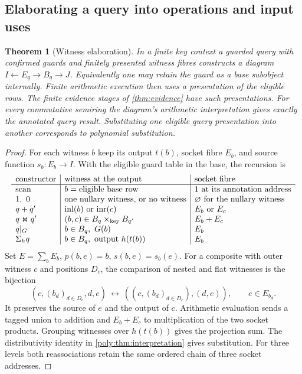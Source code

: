\documentclass[11pt,a4paper]{article}
\newtheorem{theorem}{Theorem}[section]
\theoremstyle{definition}
\theoremstyle{remark}\newaliascnt{remark}{theorem}
\numberwithin{equation}{section}
\begin{document}
\subsection{Elaborating a query into operations and input uses}
\begin{theorem}[Witness elaboration]\label{thm:elaboration}
In a finite key context a guarded query with confirmed guards and finitely presented witness fibres constructs a diagram $I\leftarrow E_q\to B_q\to J$. Equivalently one may retain the guard as a base subobject internally. Finite arithmetic execution then uses a presentation of the eligible rows. The finite evidence stages of \cref{thm:evidence} have such presentations. For every commutative semiring the diagram's arithmetic interpretation gives exactly the annotated query result. Substituting one eligible query presentation into another corresponds to polynomial substitution.
\end{theorem}
\begin{proof}
For each witness \(b\) keep its output \(t(b)\), socket fibre \(E_b\), and source function \(s_b:E_b\to I\). With the eligible guard table in the base, the recursion is
\[
\begin{array}{l|l|l}
 \text{constructor}&\text{witness at the output}&\text{socket fibre}\\ \hline
 \text{scan}& b=\text{eligible base row}&1\ \text{at its annotation address}\\
 1,\ 0 &\text{one nullary witness, or no witness}&\varnothing\ \text{for the nullary witness}\\
 q+q'&\mathrm{inl}(b)\ \text{or}\ \mathrm{inr}(c)&E_b\ \text{or}\ E_c\\
 q\Join q'&(b,c)\in B_q\times_{\rm key}B_{q'}&E_b+E_c\\
 q|_G& b\in B_q,\ G(b)&E_b\\
 \Sigma_h q& b\in B_q,\ \text{output }h(t(b))&E_b
\end{array}
\]
Set \(E=\sum_b E_b\), \(p(b,e)=b\), \(s(b,e)=s_b(e)\). For a composite with outer witness \(c\) and positions \(D_c\), the comparison of nested and flat witnesses is the bijection
\[
 (c,(b_d)_{d\in D_c},d,e)\ \longleftrightarrow\
 ((c,(b_d)_{d\in D_c}),(d,e)),\qquad e\in E_{b_d}.
\]
It preserves the source of \(e\) and the output of \(c\). Arithmetic evaluation sends a tagged union to addition and \(E_b+E_c\) to multiplication of the two socket products. Grouping witnesses over \(h(t(b))\) gives the projection sum. The distributivity identity in \cref{poly:thm:interpretation} gives substitution. For three levels both reassociations retain the same ordered chain of three socket addresses.
\end{proof}
\end{document}
